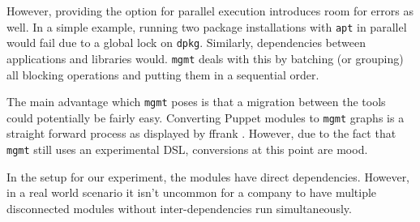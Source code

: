 However, providing the option for parallel execution introduces room for errors as well. In a simple example, running two package installations with \texttt{apt} in parallel would fail due to a global lock on \texttt{dpkg}. Similarly, dependencies between applications and libraries would. \texttt{mgmt} deals with this by batching (or grouping) all blocking operations and putting them in a sequential order. 

The main advantage which \texttt{mgmt} poses is that a migration between the tools could potentially be fairly easy. Converting Puppet modules to \texttt{mgmt} graphs is a straight forward process as displayed by ffrank \cite{}. However, due to the fact that \texttt{mgmt} still uses an experimental DSL, conversions at this point are mood. 


In the setup for our experiment, the modules have direct dependencies. However, in a real world scenario it isn't uncommon for a company to have multiple disconnected modules without inter-dependencies run simultaneously. 
